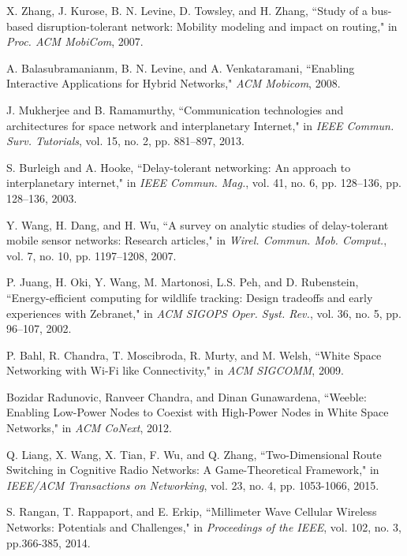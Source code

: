 \documentclass[10pt, conference, letterpaper]{IEEEtran}
\begin{document}
\begin{thebibliography}{1}

 X. Zhang, J. Kurose, B. N. Levine, D. Towsley, and H. Zhang, ``Study of a bus-based disruption-tolerant network: Mobility
modeling and impact on routing," in \emph{Proc. ACM MobiCom}, 2007.

  A. Balasubramanianm, B. N. Levine, and A. Venkataramani, ``Enabling Interactive Applications for Hybrid Networks,"  \emph{ACM Mobicom}, 2008.

 J. Mukherjee and B. Ramamurthy, ``Communication technologies and architectures for space network and interplanetary Internet," in \emph{IEEE Commun. Surv. Tutorials}, vol. 15, no. 2, pp. 881–897, 2013.

 S. Burleigh and A. Hooke, ``Delay-tolerant networking: An approach to interplanetary internet," in \emph{IEEE Commun. Mag.}, vol. 41, no. 6, pp. 128–136, pp. 128–136, 2003.

 Y. Wang, H. Dang, and H. Wu, ``A survey on analytic studies of delay-tolerant mobile sensor networks: Research articles," in \emph{Wirel. Commun. Mob. Comput.}, vol. 7, no. 10, pp. 1197–1208, 2007.

 P. Juang, H. Oki, Y. Wang, M. Martonosi, L.S. Peh, and D. Rubenstein, ``Energy-efficient computing for wildlife tracking: Design
tradeoffs and early experiences with Zebranet," in \emph{ACM SIGOPS Oper. Syst. Rev.}, vol. 36, no. 5, pp. 96–107, 2002.

 P. Bahl, R. Chandra, T. Moscibroda, R. Murty, and M. Welsh, ``White Space Networking with Wi-Fi like Connectivity," in \emph{ACM SIGCOMM}, 2009.

 Bozidar Radunovic, Ranveer Chandra, and Dinan Gunawardena, ``Weeble: Enabling Low-Power Nodes to Coexist with
High-Power Nodes in White Space Networks," in \emph{ACM CoNext}, 2012.

 Q. Liang, X. Wang, X. Tian, F. Wu, and Q. Zhang, ``Two-Dimensional Route Switching in Cognitive Radio Networks: A Game-Theoretical Framework," in \emph{IEEE/ACM Transactions on Networking}, vol. 23, no. 4, pp. 1053-1066, 2015.

 S. Rangan, T. Rappaport, and E. Erkip, ``Millimeter Wave Cellular Wireless Networks: Potentials and Challenges," in \emph{Proceedings of the IEEE}, vol. 102, no. 3, pp.366-385, 2014.
    

\end{thebibliography}
\end{document}
